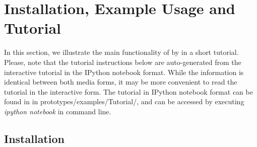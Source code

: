 \section{Installation, Example Usage and Tutorial} \label{examples}
In this section, we illustrate the main functionality of \means{} by in a short tutorial.
Please, note that the tutorial instructions below are auto-generated from the interactive tutorial in the IPython notebook format. 
While the information is identical between both media forms, it may be more convenient to read the tutorial in the interactive form. 
The tutorial in IPython notebook format can be found in \means in prototypes/examples/Tutorial/, and can be accessed by executing \emph{ipython notebook} in command line.

\subsection{Installation}



{   %

    
    
    
    
}   %


